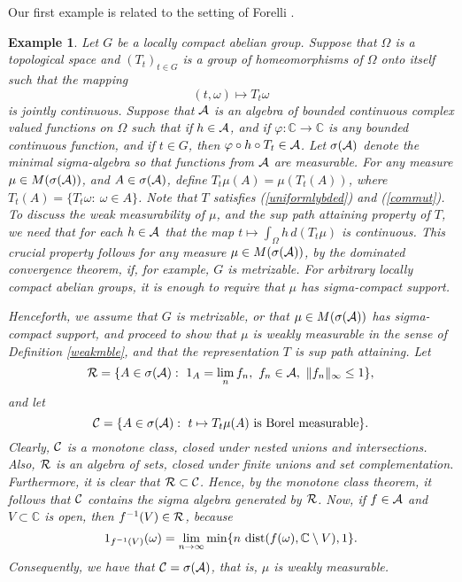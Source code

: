 \documentclass[12pt]{article}
\newcommand{\C}{\mathbb C}
\newcommand{\A}{{\cal A}}
\newcommand{\cC}{{\cal C}}
\newcommand{\cR}{{\cal R}}
\newtheorem{ex}[defin]{Example}
\begin{document}
Our first example
is related to the setting of Forelli \cite{forelli}.
\begin{ex}
{\rm  Let $G$ be a locally compact abelian group.
Suppose that $\Omega$ is a topological
space and $\left( T_t\right)_{t\in G}$ is a
 group of homeomorphisms of $\Omega$ onto itself
such that the mapping
$$(t,\omega)\mapsto T_t\omega$$
is jointly continuous.
Suppose that $\A$ is an algebra of bounded continuous complex valued
functions
on $\Omega$ such that if $h \in \A$,
and if $\varphi:\C\to\C$ is any bounded continuous function,
and if $t \in G$,
then $\varphi\circ h\circ T_t\in \A$.  Let $\sigma(\A)$ denote the
minimal sigma-algebra so that
functions from $\A$ are measurable.
For any measure $\mu\in M(\sigma(\A))$, and $A\in \sigma(\A)$,
define
$T_t\mu(A)=\mu(T_t(A))$, where $T_t(A)=\{T_t\omega:\ \omega\in A\}$.
Note that $T$ satisfies
(\ref{uniformlybded}) and (\ref{commut}).
To discuss the weak measurability of $\mu$, and the sup path attaining
property of $T$, we need that for each $h \in \A$ that the map
$t \mapsto \int_\Omega h \, d(T_t\mu)$ is continuous.  
This 
crucial property follows
for any measure $\mu\in M(\sigma(\A))$, by the dominated convergence theorem, if, for example, $G$ is metrizable.  For arbitrary locally compact abelian groups, it is enough to require that $\mu$ has sigma-compact support.

Henceforth, we assume that $G$ is metrizable, or that $\mu\in M(\sigma(\A))$ has sigma-compact support, and proceed to show that
$\mu$ is
weakly measurable in the sense of Definition \ref{weakmble}, and that
the representation $T$ is sup path attaining.
Let
$$\cR=\{A\in \sigma(\A) :\ 1_A=\lim_n f_n,\ f_n \in \A,\
\|f_n\|_\infty\leq 1\},$$
and let
$$\cC=\{A\in \sigma(\A):  \ t\mapsto T_t\mu(A)\
{\rm is\ Borel\ measurable}\}.$$
Clearly, $\cC$ is a monotone class, closed under
nested unions and intersections.  Also, $\cR$
is an algebra of sets, closed under finite unions and
set complementation.  Furthermore, it is clear that $\cR \subset \cC$.
Hence, by the monotone class theorem,
it follows that $\cC$ contains the
sigma algebra generated by $\cR$.
Now, if $f\in\A$ and $V \subset \C$ is open, then $f^{-1}(V) \in \cR$, because
$$1_{f^{-1}(V)}(\omega)=
\lim_{n\rightarrow \infty} \min \{ n\ {\rm dist}(f(\omega),\C\setminus V)
,1\}.$$
Consequently, we have that $\cC = \sigma(\A)$, that is,
$\mu$ is weakly measurable.

}
\end{ex}
\end{document}
